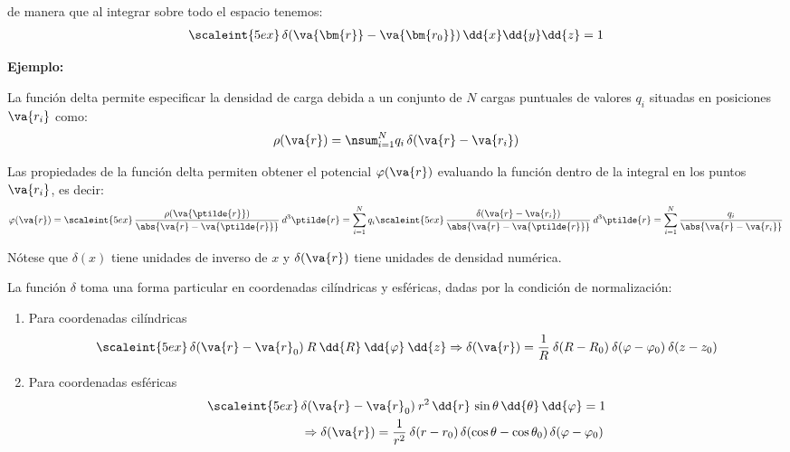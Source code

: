 de manera que al integrar sobre todo el espacio tenemos:
\begin{align*}
\scaleint{5ex} \, \delta (\va{\bm{r}} - \va{\bm{r_{0}}}) \, \dd{x} \dd{y} \dd{z} = 1
\end{align*}

\textbf{Ejemplo:}

La función delta permite especificar la densidad de carga debida a un conjunto de $N$ cargas puntuales de valores $q_{i}$ situadas en posiciones $\va{r_{i}}$  como:
\begin{align}
\rho (\va{r}) = \nsum_{i=1}^{N} q_{i} \, \delta(\va{r} - \va{r_{i}})
\label{eq:ecuacion_A_04}
\end{align}

Las propiedades de la función delta permiten obtener el potencial $\varphi(\va{r})$ evaluando la función dentro de la integral en los puntos $\va{r_{i}}$, es decir:
\begin{align}
\varphi(\va{r}) = \scaleint{5ex} \, \dfrac{\rho(\va{\ptilde{r}})}{\abs{\va{r} - \va{\ptilde{r}}}} \: d^{3}\ptilde{r} = \sum_{i=1}^{N} q_{i} \scaleint{5ex} \, \dfrac{\delta ( \va{r} - \va{r_{i}})}{\abs{\va{r} - \va{\ptilde{r}}}} \: d^{3}\ptilde{r} = \sum_{i=1}^{N} \dfrac{q_{i}}{\abs{\va{r} - \va{r_{i}}}}
\label{eq:ecuacion_A_05}
\end{align}

Nótese que $\delta (x)$ tiene unidades de inverso de $x$ y $\delta (\va{r})$ tiene unidades de densidad numérica.
\par
La función $\delta$ toma una forma particular en coordenadas cilíndricas y esféricas, dadas por la condición de normalización:
\begin{enumerate}
\item Para coordenadas cilíndricas
\begin{equation}
\scaleint{5ex} \, \delta (\va{r} - \va{r}_{0}) \: R \: \dd{R} \: \dd{\varphi} \: \dd{z} \Rightarrow \delta (\va{r}) =  \dfrac{1}{R} \: \delta (R - R_{0}) \: \delta (\varphi - \varphi_{0}) \: \delta (z - z_{0})
\end{equation}
\item  Para coordenadas esféricas
\begin{equation}
\begin{aligned}
\scaleint{5ex} \, & \delta (\va{r} - \va{r}_{0}) \: r^{2} \, \dd{r} \, \sin \theta \, \dd{\theta} \, \dd{\varphi} = 1 \\
&\Rightarrow \delta (\va{r}) = \dfrac{1}{r^{2}} \: \delta (r - r_{0}) \, \delta (\cos \theta - \cos \theta_{0}) \, \delta (\varphi - \varphi_{0})
\end{aligned}
\end{equation}
\end{enumerate}

